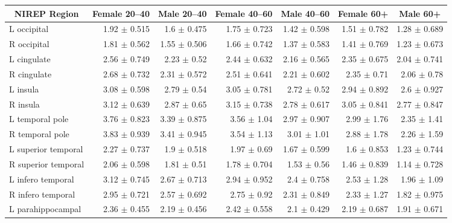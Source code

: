 \begin{table*}
\centering
\begin{tabular*}{0.975\textwidth}{@{\extracolsep{\fill}} l r r r r r r }
\toprule
  \multicolumn{1}{c}{\bf NIREP Region} & 
    \multicolumn{1}{c}{\bf Female 20--40} & \multicolumn{1}{c}{\bf Male 20--40} & 
    \multicolumn{1}{c}{\bf Female 40--60} & \multicolumn{1}{c}{\bf Male 40--60} &  
     \multicolumn{1}{c}{\bf Female 60+} & \multicolumn{1}{c}{\bf Male 60+} \\
\midrule
L occipital & 1.92 $\pm$ 0.515 & 1.6 $\pm$ 0.475 & 1.75 $\pm$ 0.723 & 1.42 $\pm$ 0.598 & 1.51 $\pm$ 0.782 & 1.28 $\pm$ 0.689 \\
R occipital & 1.81 $\pm$ 0.562 & 1.55 $\pm$ 0.506 & 1.66 $\pm$ 0.742 & 1.37 $\pm$ 0.583 & 1.41 $\pm$ 0.769 & 1.23 $\pm$ 0.673 \\
L cingulate & 2.56 $\pm$ 0.749 & 2.23 $\pm$ 0.52 & 2.44 $\pm$ 0.632 & 2.16 $\pm$ 0.565 & 2.35 $\pm$ 0.675 & 2.04 $\pm$ 0.741 \\
R cingulate & 2.68 $\pm$ 0.732 & 2.31 $\pm$ 0.572 & 2.51 $\pm$ 0.641 & 2.21 $\pm$ 0.602 & 2.35 $\pm$ 0.71 & 2.06 $\pm$ 0.78 \\
L insula & 3.08 $\pm$ 0.598 & 2.79 $\pm$ 0.54 & 3.05 $\pm$ 0.781 & 2.72 $\pm$ 0.52 & 2.94 $\pm$ 0.892 & 2.6 $\pm$ 0.927 \\
R insula & 3.12 $\pm$ 0.639 & 2.87 $\pm$ 0.65 & 3.15 $\pm$ 0.738 & 2.78 $\pm$ 0.617 & 3.05 $\pm$ 0.841 & 2.77 $\pm$ 0.847 \\
L temporal pole & 3.76 $\pm$ 0.823 & 3.39 $\pm$ 0.875 & 3.56 $\pm$ 1.04 & 2.97 $\pm$ 0.907 & 2.99 $\pm$ 1.76 & 2.35 $\pm$ 1.41 \\
R temporal pole & 3.83 $\pm$ 0.939 & 3.41 $\pm$ 0.945 & 3.54 $\pm$ 1.13 & 3.01 $\pm$ 1.01 & 2.88 $\pm$ 1.78 & 2.26 $\pm$ 1.59 \\
L superior temporal & 2.27 $\pm$ 0.737 & 1.9 $\pm$ 0.518 & 1.97 $\pm$ 0.69 & 1.67 $\pm$ 0.599 & 1.6 $\pm$ 0.853 & 1.23 $\pm$ 0.744 \\
R superior temporal & 2.06 $\pm$ 0.598 & 1.81 $\pm$ 0.51 & 1.78 $\pm$ 0.704 & 1.53 $\pm$ 0.56 & 1.46 $\pm$ 0.839 & 1.14 $\pm$ 0.728 \\
L infero temporal & 3.12 $\pm$ 0.745 & 2.67 $\pm$ 0.713 & 2.94 $\pm$ 0.952 & 2.4 $\pm$ 0.758 & 2.53 $\pm$ 1.28 & 1.96 $\pm$ 1.09 \\
R infero temporal & 2.95 $\pm$ 0.721 & 2.57 $\pm$ 0.692 & 2.75 $\pm$ 0.92 & 2.31 $\pm$ 0.849 & 2.33 $\pm$ 1.27 & 1.82 $\pm$ 0.975 \\
L parahippocampal & 2.36 $\pm$ 0.455 & 2.19 $\pm$ 0.456 & 2.42 $\pm$ 0.558 & 2.1 $\pm$ 0.429 & 2.19 $\pm$ 0.687 & 1.91 $\pm$ 0.671 \\

\end{tabular*}
\end{table*}
